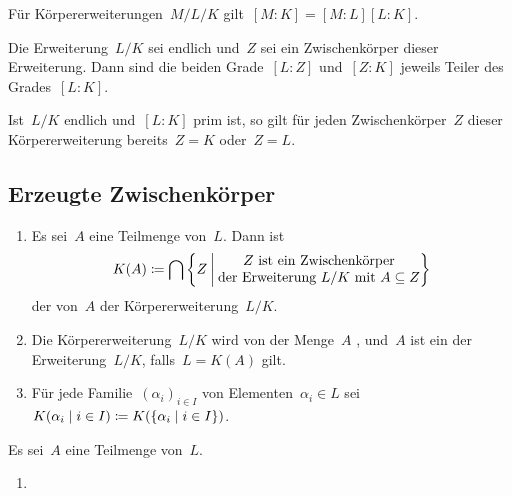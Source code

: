 \begin{theorem}[Gradformel]
  Für Körpererweiterungen~$M/L/K$ gilt~$[M : K] = [M : L] [L : K]$.
\end{theorem}

\begin{corollary}
  Die Erweiterung~$L/K$ sei endlich und~$Z$ sei ein Zwischenkörper dieser Erweiterung.
  Dann sind die beiden Grade~$[L : Z]$ und~$[Z : K]$ jeweils Teiler des Grades~$[L : K]$.
\end{corollary}

\begin{example}
  Ist~$L/K$ endlich und~$[L : K]$ prim ist, so gilt für jeden Zwischenkörper~$Z$ dieser Körpererweiterung bereits~$Z = K$ oder~$Z = L$.
\end{example}



\subsection{Erzeugte Zwischenkörper}

\begin{definition}
  \leavevmode
  \begin{enumerate}
    \item
      Es sei~$A$ eine Teilmenge von~$L$.
      Dann ist
      \[
        K(A)
        \defined
        \bigcap
        \left\{
          Z
        \suchthat*
          \begin{tabular}{@{}c@{}}
             $Z$ ist ein Zwischenkörper\\
             der Erweiterung~$L/K$ mit~$A \subseteq Z$
          \end{tabular}
        \right\}
      \]
      der von~$A$  der Körpererweiterung~$L/K$.
    \item
      Die Körpererweiterung~$L/K$ wird von der Menge~$A$ , und~$A$ ist ein  der Erweiterung~$L/K$, falls~$L = K(A)$ gilt.
    \item
      Für jede Familie~$(\alpha_i)_{i \in I}$ von Elementen~$\alpha_i \in L$ sei~$K(\alpha_i \suchthat i \in I) \defined K( \{ \alpha_i \suchthat i \in I \})$.
  \end{enumerate}
\end{definition}

\begin{proposition}
  Es sei~$A$ eine Teilmenge von~$L$.
  \begin{enumerate}
    \item
      
  \end{enumerate}
\end{proposition}

